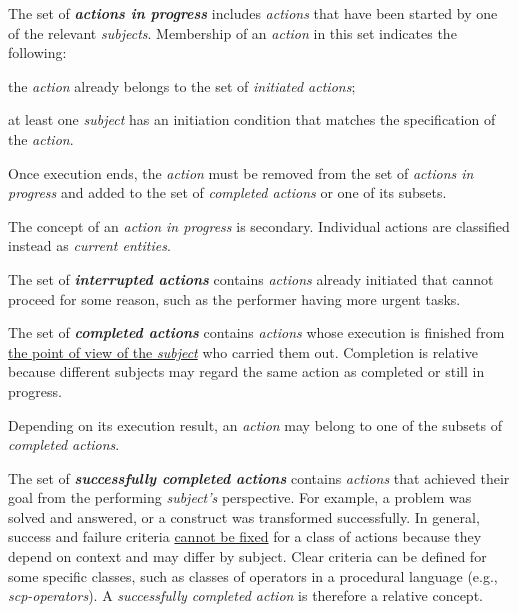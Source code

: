 \begin{frame}{}
\justifying
\vspace{10mm}

The set of \textbf{\textit{actions in progress}} includes \textit{actions} that have been started by one of the relevant \textit{subjects}.
Membership of an \textit{action} in this set indicates the following:
\begin{textitemize}
	\item the \textit{action} already belongs to the set of \textit{initiated actions};
	\item at least one \textit{subject} has an initiation condition that matches the specification of the \textit{action}.
\end{textitemize}

Once execution ends, the \textit{action} must be removed from the set of \textit{actions in progress} and added to the set of \textit{completed actions} or one of its subsets.

The concept of an \textit{action in progress} is secondary. Individual actions are classified instead as \textit{current entities}.
\end{frame}

\begin{frame}{}
\justifying
\vspace{10mm}

The set of \textbf{\textit{interrupted actions}} contains \textit{actions} already initiated that cannot proceed for some reason, such as the performer having more urgent tasks.

\bigskip

The set of \textbf{\textit{completed actions}} contains \textit{actions} whose execution is finished from \uline{the point of view of the \textit{subject}} who carried them out. Completion is relative because different subjects may regard the same action as completed or still in progress.

Depending on its execution result, an \textit{action} may belong to one of the subsets of \textit{completed actions}.
\end{frame}

\begin{frame}{}
\justifying
\vspace{10mm}

The set of \textbf{\textit{successfully completed actions}} contains \textit{actions} that achieved their goal from the performing \textit{subject's} perspective. For example, a problem was solved and answered, or a construct was transformed successfully. In general, success and failure criteria \uline{cannot be fixed} for a class of actions because they depend on context and may differ by subject. Clear criteria can be defined for some specific classes, such as classes of operators in a procedural language (e.g., \textit{scp-operators}). A \textit{successfully completed action} is therefore a relative concept.
\end{frame}

